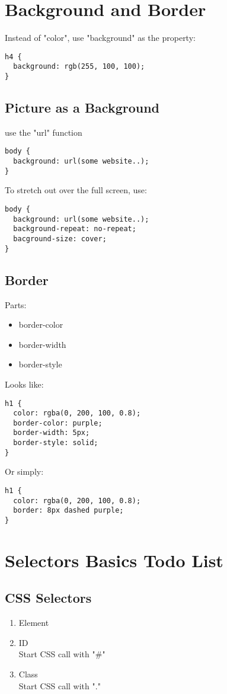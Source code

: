 \documentclass{article}
\begin{document}
\section{Background and Border}
Instead of "color", use "background" as the property:
\begin{verbatim}
h4 {
  background: rgb(255, 100, 100);
}
\end{verbatim}

\subsection*{Picture as a Background}
use the "url" function
\begin{verbatim}
body {
  background: url(some website..);
}
\end{verbatim}
To stretch out over the full screen, use:
\begin{verbatim}
body {
  background: url(some website..);
  background-repeat: no-repeat;
  bacground-size: cover;
}
\end{verbatim}

\subsection*{Border}
Parts:
\begin{itemize}
	\item border-color
	\item border-width
	\item border-style
\end{itemize}
Looks like:
\begin{verbatim}
h1 {
  color: rgba(0, 200, 100, 0.8);
  border-color: purple;
  border-width: 5px;
  border-style: solid;
}
\end{verbatim}
Or simply:
\begin{verbatim}
h1 {
  color: rgba(0, 200, 100, 0.8);
  border: 8px dashed purple;
}
\end{verbatim}

\section{Selectors Basics Todo List}
\subsection*{CSS Selectors}
\begin{enumerate}
	\item Element
	\item ID
	\\Start CSS call with "\#"
	\item Class
	\\Start CSS call with "."
\end{enumerate}
\end{document}
